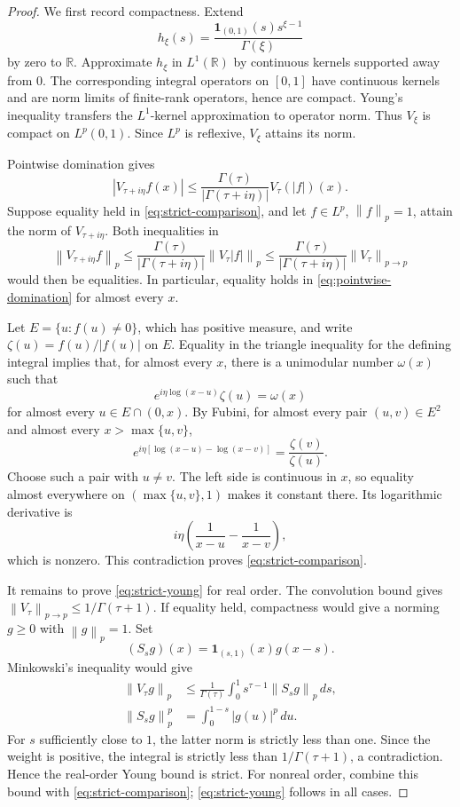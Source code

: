 \documentclass[11pt]{article}
\newcommand{\R}{\mathbb R}
\newcommand{\1}{\mathbf 1}
\newcommand{\norm}[1]{\left\lVert #1\right\rVert}
\begin{document}
\begin{proof}
We first record compactness.  Extend
\[
 h_\xi(s)=\frac{\1_{(0,1)}(s)s^{\xi-1}}{\Gamma(\xi)}
\]
by zero to \(\R\).  Approximate \(h_\xi\) in \(L^1(\R)\) by continuous
kernels supported away from \(0\).  The corresponding integral operators on
\([0,1]\) have continuous kernels and are norm limits of finite-rank
operators, hence are compact.  Young's inequality transfers the
\(L^1\)-kernel approximation to operator norm.  Thus \(V_\xi\) is compact on
\(L^p(0,1)\).  Since \(L^p\) is reflexive, \(V_\xi\) attains its norm.

Pointwise domination gives
\begin{equation}\label{eq:pointwise-domination}
 |V_{\tau+i\eta}f(x)|
 \le \frac{\Gamma(\tau)}{|\Gamma(\tau+i\eta)|}
 V_\tau(|f|)(x).
\end{equation}
Suppose equality held in \eqref{eq:strict-comparison}, and let
\(f\in L^p\), \(\norm{f}_p=1\), attain the norm of
\(V_{\tau+i\eta}\).  Both inequalities in
\[
 \norm{V_{\tau+i\eta}f}_p
 \le\frac{\Gamma(\tau)}{|\Gamma(\tau+i\eta)|}
 \norm{V_\tau|f|}_p
 \le\frac{\Gamma(\tau)}{|\Gamma(\tau+i\eta)|}
 \norm{V_\tau}_{p\to p}
\]
would then be equalities.  In particular, equality holds in
\eqref{eq:pointwise-domination} for almost every \(x\).

Let \(E=\{u:f(u)\ne0\}\), which has positive measure, and write
\(\zeta(u)=f(u)/|f(u)|\) on \(E\).  Equality in the triangle inequality for
the defining integral implies that, for almost every \(x\), there is a
unimodular number \(\omega(x)\) such that
\begin{equation}\label{eq:phase-alignment}
 e^{i\eta\log(x-u)}\zeta(u)=\omega(x)
\end{equation}
for almost every \(u\in E\cap(0,x)\).  By Fubini, for almost every pair
\((u,v)\in E^2\) and almost every \(x>\max\{u,v\}\),
\[
 e^{i\eta[\log(x-u)-\log(x-v)]}=\frac{\zeta(v)}{\zeta(u)}.
\]
Choose such a pair with \(u\ne v\).  The left side is continuous in \(x\),
so equality almost everywhere on \((\max\{u,v\},1)\) makes it constant there.
Its logarithmic derivative is
\[
 i\eta\left(\frac1{x-u}-\frac1{x-v}\right),
\]
which is nonzero.  This contradiction proves
\eqref{eq:strict-comparison}.

It remains to prove \eqref{eq:strict-young} for real order.  The convolution
bound gives \(\norm{V_\tau}_{p\to p}\le1/\Gamma(\tau+1)\).  If equality
held, compactness would give a norming \(g\ge0\) with \(\norm g_p=1\).  Set
\[
 (S_sg)(x)=\1_{(s,1)}(x)g(x-s).
\]
Minkowski's inequality would give
\begin{align*}
 \norm{V_\tau g}_p
 &\le\frac1{\Gamma(\tau)}
 \int_0^1s^{\tau-1}\norm{S_sg}_p\,ds,\\
 \norm{S_sg}_p^p&=\int_0^{1-s}|g(u)|^p\,du.
\end{align*}
For \(s\) sufficiently close to \(1\), the latter norm is strictly less than
one.  Since the weight is positive, the integral is strictly less than
\(1/\Gamma(\tau+1)\), a contradiction.  Hence the real-order Young bound is
strict.  For nonreal order, combine this bound with
\eqref{eq:strict-comparison}; \eqref{eq:strict-young} follows in all cases.
\end{proof}
\end{document}
